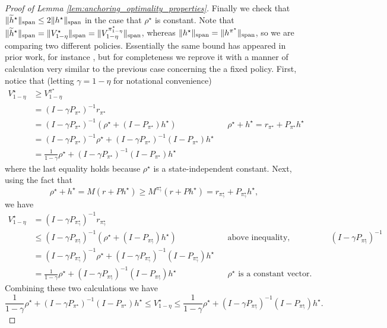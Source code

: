 \documentclass{article}
\theoremstyle{plain}
\theoremstyle{plain}
\theoremstyle{remark}
\theoremstyle{plain}
\theoremstyle{plain}
\newcommand{\pistar}{\pi^\star}
\newcommand{\htilde}{\widetilde{h}}
\begin{document}
\begin{proof}[Proof of Lemma \ref{lem:anchoring_optimality_properties}]
    Finally we check that $\spannorm{\htilde^\star} \leq 2 \spannorm{h^\star}$ in the case that $\rho^\star$ is constant. Note that $\spannorm{\htilde^\star} = \spannorm{V^\star_{1-\eta}} = \spannorm{V_{1-\eta}^{\pistar_{1-\eta}}}$, whereas $\spannorm{h^\star} = \spannorm{h^{\pistar}}$, so we are comparing two different policies. Essentially the same bound has appeared in prior work, for instance \cite[Lemma 2]{wei_model-free_2020}, but for completeness we reprove it with a manner of calculation very similar to the previous case concerning the a fixed policy. First, notice that (letting $\gamma = 1-\eta$ for notational convenience)
    \begin{align*}
        V^\star_{1-\eta} &\geq V^{\pistar}_{1-\eta} \\
        &= (I - \gamma P_{\pistar})^{-1} r_{\pistar} \\
        &= (I - \gamma P_{\pistar})^{-1} \left(\rho^\star + (I - P_{\pistar})h^\star \right) && \text{$\rho^\star + h^{\star} = r_{\pistar} + P_{\pistar} h^\star$} \\
        &= (I - \gamma P_{\pistar})^{-1} \rho^\star + (I - \gamma P_{\pistar})^{-1} (I - P_{\pistar})h^\star \\
        &= \frac{1}{1-\gamma} \rho^\star + (I - \gamma P_{\pistar})^{-1} (I - P_{\pistar})h^\star
    \end{align*}
    where the last equality holds because $\rho^\star$ is a state-independent constant.
    Next, using the fact that
    \[
        \rho^\star + h^\star = M(r + P h^\star) \geq M^{\pistar_\gamma} (r + P h^\star) = r_{\pistar_\gamma} + P_{\pistar_\gamma} h^\star,
    \]
    we have
    \begin{align*}
        V^\star_{1-\eta} & = (I - \gamma P_{\pistar_\gamma})^{-1} r_{\pistar_\gamma} \\
        & \leq (I - \gamma P_{\pistar_\gamma})^{-1} \left( \rho^\star + (I - P_{\pistar_\gamma}) h^\star \right) && \text{above inequality, monotonicity of $(I - \gamma P_{\pistar_\gamma})^{-1}$} \\
        &= (I - \gamma P_{\pistar_\gamma})^{-1} \rho^\star + (I - \gamma P_{\pistar_\gamma})^{-1} (I - P_{\pistar_\gamma}) h^\star \\
        &= \frac{1}{1-\gamma}\rho^\star + (I - \gamma P_{\pistar_\gamma})^{-1} (I - P_{\pistar_\gamma}) h^\star && \text{$\rho^\star$ is a constant vector}.
    \end{align*}
    Combining these two calculations we have
    \[
       \frac{1}{1-\gamma} \rho^\star + (I - \gamma P_{\pistar})^{-1} (I - P_{\pistar})h^\star \leq  V^\star_{1-\eta} \leq \frac{1}{1-\gamma}\rho^\star + (I - \gamma P_{\pistar_\gamma})^{-1} (I - P_{\pistar_\gamma}) h^\star.
\]
\end{proof}
\end{document}
